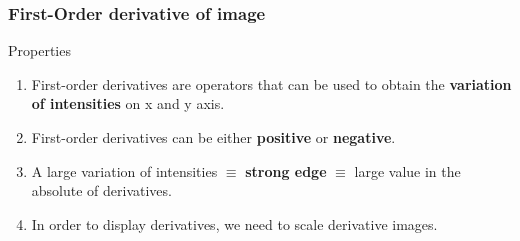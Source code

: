 \documentclass[english,11pt,table,handout]{beamer}
\begin{document}
{
	\frametitle{First-Order derivative of image}
	
	\begin{alertblock}{Properties}
		\begin{enumerate}
			\item First-order derivatives are operators that can be used to obtain the \alert{\textbf{variation of intensities}} on x and y axis.
			\item First-order derivatives can be either \alert{\textbf{positive}} or \alert{\textbf{negative}}.
			\item A large variation of intensities $\equiv$ \alert{\textbf{strong edge}} $\equiv$ large value in the absolute of derivatives.
			\item In order to display derivatives, we need to scale derivative images.
		\end{enumerate}
	\end{alertblock}
}
\end{document}
